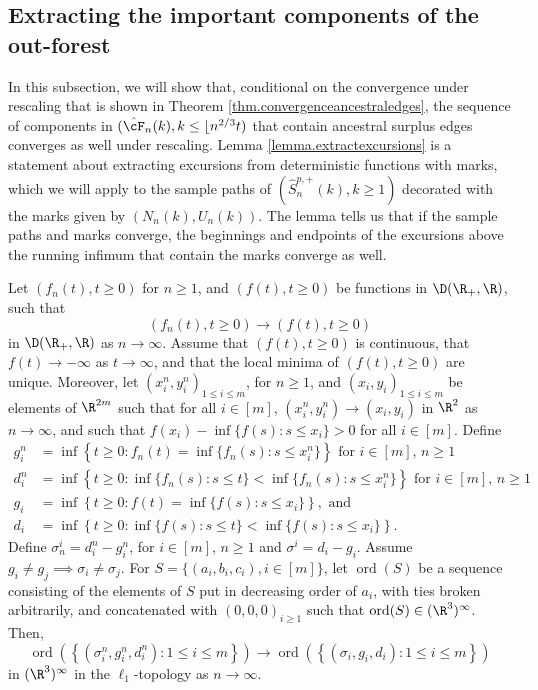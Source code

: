 \subsection{Extracting the important components of the out-forest}
In this subsection, we will show that, conditional on the convergence under rescaling that is shown in Theorem \ref{thm.convergenceancestraledges}, the sequence of components in $(\hat{\cF}_n(k),k\leq \lfloor n^{2/3}t)$ that contain ancestral surplus edges converges as well under rescaling. Lemma \ref{lemma.extractexcursions} is a statement about extracting excursions from deterministic functions with marks, which we will apply to the sample paths of $(\hat{S}_n^{p,+}(k),k\geq 1)$ decorated with the marks given by $(N_n(k),U_n(k))$. The lemma tells us that if the sample paths and marks converge, the beginnings and endpoints of the excursions above the running infimum that contain the marks converge as well.  
\begin{lemma}\label{lemma.extractexcursions}
Let $(f_n(t), t\geq 0)$ for $n\geq 1$, and $(f(t),t\geq 0)$ be functions in $\D(\R_+,\R)$, such that 
$$(f_n(t), t\geq 0)\to (f(t),t\geq 0)$$ in $\D(\R_+,\R)$ as $n\to \infty$. Assume that $(f(t),t\geq 0)$ is continuous, that $f(t)\to -\infty$ as $t\to \infty$, and that the local minima of $(f(t),t\geq 0)$ are unique. Moreover, let $(x_i^n,y_i^n)_{1\leq i\leq m}$, for $n\geq 1$, and $(x_i,y_i)_{1\leq i\leq m}$ be elements of $\R^{2m}$ such that for all $i\in [m]$, $(x_i^n,y_i^n)\to (x_i,y_i)$ in $\R^2$ as $n\to \infty$, and such that $f(x_i)-\inf\{f(s):s\leq x_i\}>0$ for all $i\in [m]$. Define
\begin{align*}g_i^n&=\inf\left\{t\geq 0:f_n(t)=\inf\{f_n(s):s\leq x_i^n\}\right\}\text{ for }i\in [m]\text{, }n\geq 1\\
d_i^n&=\inf\left\{ t\geq 0: \inf\{f_n(s):s\leq t\} < \inf\{f_n(s):s\leq x_i^n\}\right\}\text{ for }i\in [m]\text{, }n\geq 1\\
g_i&=\inf\left\{t\geq 0:f(t)=\inf\{f(s):s\leq x_i\}\right\},\text{ and}\\
d_i&=\inf\left\{ t\geq 0: \inf\{f(s):s\leq t\} < \inf\{f(s):s\leq x_i\}\right\}.
\end{align*}
Define $\sigma^i_n=d_i^n-g_i^n$, for $i\in [m]$, $n\geq 1$ and $\sigma^i=d_i-g_i$. Assume $g_i\neq g_j\implies \sigma_i\neq \sigma_j$. For $S=\{(a_i,b_i,c_i), i\in [m]\}$, let $\operatorname{ord}(S)$ be a sequence consisting of the elements of $S$ put in decreasing order of $a_i$, with ties broken arbitrarily, and concatenated with $(0,0,0)_{i\geq 1}$ such that $\operatorname{ord}(S)\in (\R^3)^\infty$. Then, 
$$\operatorname{ord}\left(\left\{(\sigma_i^n,g_i^n,d_i^n):1\leq i \leq m\right\}\right)\to \operatorname{ord}\left(\left\{(\sigma_i,g_i,d_i):1\leq i \leq m\right\}\right)$$
in $(\R^{3})^\infty$ in the $\ell_1$-topology as $n\to \infty$. 
\end{lemma}
